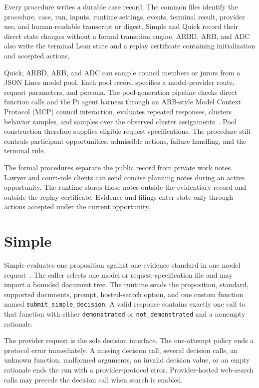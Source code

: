 \documentclass[11pt]{article}
\newcommand{\code}[1]{\texttt{#1}}
\begin{document}
Every procedure writes a durable case record.  The common files identify the procedure, case, run, inputs, runtime settings, events, terminal result, provider use, and human-readable transcript or digest.  Simple and Quick record their direct state changes without a formal transition engine.  ARBD, ARB, and ADC also write the terminal Lean state and a replay certificate containing initialization and accepted actions.

Quick, ARBD, ARB, and ADC can sample council members or jurors from a JSON Lines model pool.  Each pool record specifies a model-provider route, request parameters, and persona.  The pool-generation pipeline checks direct function calls and the Pi agent harness through an ARB-style Model Context Protocol (MCP) council interaction, evaluates repeated responses, clusters behavior samples, and samples over the observed cluster assignments~\cite{poolpaper}.  Pool construction therefore supplies eligible request specifications.  The procedure still controls participant opportunities, admissible actions, failure handling, and the terminal rule.

The formal procedures separate the public record from private work notes.  Lawyer and court-role clients can send concise planning notes during an active opportunity.  The runtime stores those notes outside the evidentiary record and outside the replay certificate.  Evidence and filings enter state only through actions accepted under the current opportunity.

\section{Simple}

Simple evaluates one proposition against one evidence standard in one model request~\cite{manuals}.  The caller selects one model or request-specification file and may import a bounded document tree.  The runtime sends the proposition, standard, supported documents, prompt, hosted-search option, and one custom function named \code{submit\_simple\_decision}.  A valid response contains exactly one call to that function with either \code{demonstrated} or \code{not\_demonstrated} and a nonempty rationale.

The provider request is the sole decision interface.  The one-attempt policy ends a protocol error immediately.  A missing decision call, several decision calls, an unknown function, malformed arguments, an invalid decision value, or an empty rationale ends the run with a provider-protocol error.  Provider-hosted web-search calls may precede the decision call when search is enabled.
\end{document}
